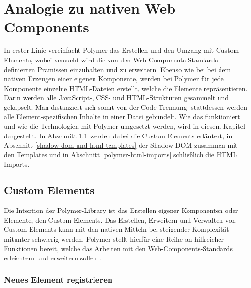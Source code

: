 \chapter{Analogie zu nativen Web Components}\label{analogie-zu-nativen-web-components}

In erster Linie vereinfacht Polymer das Erstellen und den Umgang mit Custom Elements, wobei versucht wird die von den Web-Components-Standards definierten Prämissen einzuhalten und zu erweitern. Ebenso wie bei bei dem nativen Erzeugen einer eigenen Komponente, werden bei Polymer für jede Komponente einzelne \ac{HTML}-Dateien erstellt, welche die Elemente repräsentieren. Darin werden alle JavaScript-, \ac{CSS}- und \ac{HTML}-Strukturen gesammelt und gekapselt. Man distanziert sich somit von der Code-Trennung, stattdessen werden alle Element-spezifischen Inhalte in einer Datei gebündelt. Wie das funktioniert und wie die Technologien mit Polymer umgesetzt werden, wird in diesem Kapitel dargestellt. In Abschnitt \ref{polymer-custom-elements} werden dabei die Custom Elements erläutert, in Abschnitt \ref{shadow-dom-und-html-templates} der Shadow \ac{DOM} zusammen mit den Templates und in Abschnitt \ref{polymer-html-imports} schließlich die \ac{HTML} Imports.


\section{Custom Elements}\label{polymer-custom-elements}

Die Intention der Polymer-Library ist das Erstellen eigener Komponenten oder Elemente, den Custom Elements. Das Erstellen, Erweitern und Verwalten von Custom Elements kann mit den nativen Mitteln bei steigender Komplexität mitunter schwierig werden. Polymer stellt hierfür eine Reihe an hilfreicher Funktionen bereit, welche das Arbeiten mit den Web-Components-Standards erleichtern und erweitern sollen \cite{citeulike:13915080}.


\subsection{Neues Element registrieren}\label{neues-element-registrieren}


